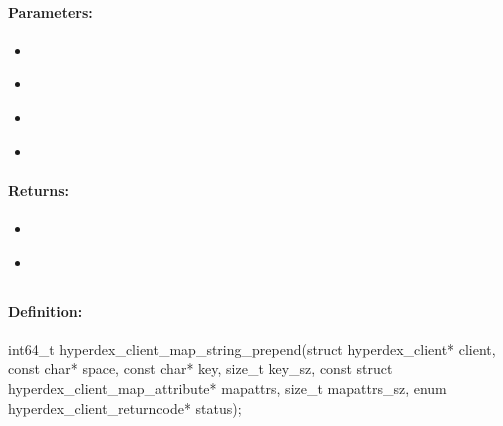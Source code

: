 \paragraph{Parameters:}
\begin{itemize}[noitemsep]
\item {}\\

\item {}\\

\item {}\\

\item {}\\

\end{itemize}

\paragraph{Returns:}
\begin{itemize}[noitemsep]
\item {}\\

\item {}\\

\end{itemize}

\pagebreak
\subsection{}
\label{api:c:map_string_prepend}


\paragraph{Definition:}
\begin{ccode}
int64_t hyperdex_client_map_string_prepend(struct hyperdex_client* client,
        const char* space,
        const char* key, size_t key_sz,
        const struct hyperdex_client_map_attribute* mapattrs, size_t mapattrs_sz,
        enum hyperdex_client_returncode* status);
\end{ccode}

